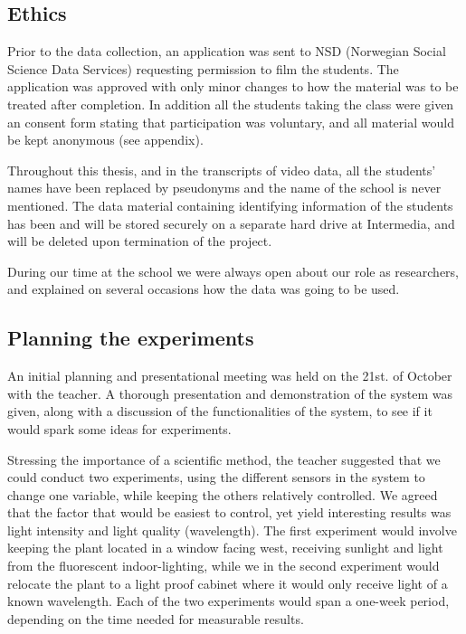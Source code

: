\subsection{Ethics}
Prior to the data collection, an application was sent to NSD (Norwegian Social Science Data Services) requesting permission to film the students. The application was approved with only minor changes to how the material was to be treated after completion. In addition all the students taking the class were given an consent form stating that participation was voluntary, and all material would be kept anonymous (see appendix). 

Throughout this thesis, and in the transcripts of video data, all the students' names have been replaced by pseudonyms and the name of the school is never mentioned. The data material containing identifying information of the students has been and will be stored securely on a separate hard drive at Intermedia, and will be deleted  upon termination of the project. 

During our time at the school we were always open about our role as researchers, and explained on several occasions how the data was going to be used. 

\subsection{Planning the experiments}
An initial planning and presentational meeting was held on the 21st. of October with the teacher. A thorough presentation and demonstration of the system was given, along with a discussion of the functionalities of the system, to see if it would spark some ideas for experiments. 

Stressing the importance of a scientific method, the teacher suggested that we could conduct two experiments, using the different sensors in the system to change one variable, while keeping the others relatively controlled. We agreed that the factor that would be easiest to control, yet yield interesting results was light intensity and light quality (wavelength). The first experiment would involve keeping the plant located in a window facing west, receiving sunlight and light from the fluorescent indoor-lighting, while we in the second experiment would relocate the plant to a light proof cabinet where it would only receive light of a known wavelength. Each of the two experiments would span a one-week period, depending on the time needed for measurable results.

